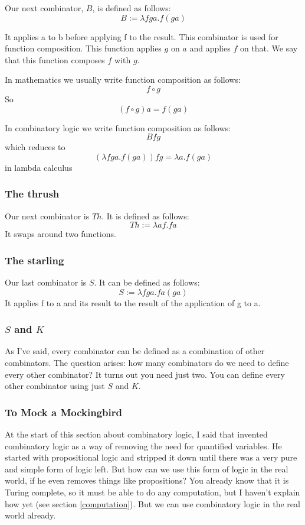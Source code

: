 \documentclass[11pt]{article}
\begin{document}
Our next combinator, \(B\), is defined as follows:
\[B:=\lambda fga.f(ga)\]

It applies a to b before applying f to the result. This combinator is used for
function composition. This function applies \(g\) on \(a\) and applies \(f\) on
that. We say that this function composes \(f\) with \(g\).

In mathematics we usually write function composition as follows:
\[f\circ g\]
So
\[(f\circ g)a=f(ga)\]

In combinatory logic we write function composition as follows:
\[Bfg\]
which reduces to
\[(\lambda fga.f(ga))fg=\lambda a.f(ga)\]
in lambda calculus

\subsubsection{The thrush}

Our next combinator is \(Th\). It is defined as follows:
\[Th:=\lambda af.fa\]
It swaps around two functions.

\subsubsection{The starling}

Our last combinator is \(S\). It can be defined as follows:
\[S:=\lambda fga.fa(ga)\]
It applies f to a and its result to the result of the application of g to a.

\subsubsection{\(S\) and \(K\)}


As I've said, every combinator can be defined as a combination of other
combinators. The question arises: how many combinators do we need to define
every other combinator? It turns out you need just two. You can define every
other combinator using just \(S\) and \(K\).


\subsubsection{To Mock a Mockingbird}

At the start of this section about combinatory logic, I said that
\textcite{schonfinkel1924} invented combinatory logic as a way of removing the
need for quantified variables. He started with propositional logic and stripped
it down until there was a very pure and simple form of logic left. But how can
we use this form of logic in the real world, if he even removes things like
propositions? You already know that it is Turing complete, so it must be able
to do any computation, but I haven't explain how yet (see section
\ref{computation}). But we can use combinatory logic in the real world already.
\end{document}
